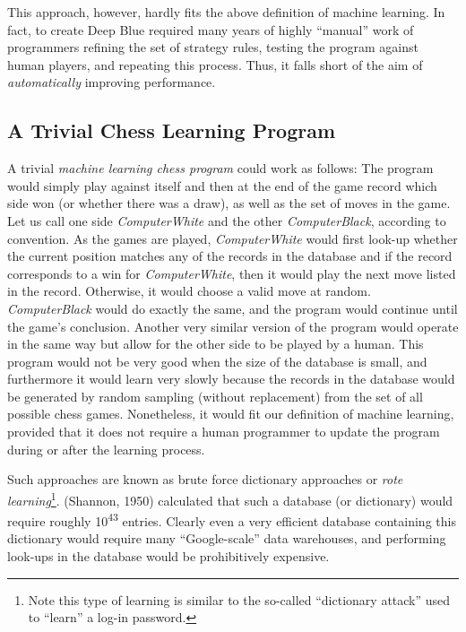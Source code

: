 This approach, however, hardly fits the above definition of machine learning. In fact, to create Deep Blue required many years of highly ``manual'' work of programmers refining the set of strategy rules, testing the program against human players, and repeating this process. Thus, it falls short of the aim of \emph{automatically} improving performance.

\subsection{A Trivial Chess Learning Program}
\label{sec:trivial-learning}

A trivial \emph{machine learning chess program} could work as follows: The program would simply play against itself and then at the end of the game record which side won (or whether there was a draw), as well as the set of moves in the game. Let us call one side \emph{ComputerWhite} and the other \emph{ComputerBlack}, according to convention. As the games are played, \emph{ComputerWhite} would first look-up whether the current position matches any of the records in the database and if the record corresponds to a win for \emph{ComputerWhite}, then it would play the next move listed in the record.  Otherwise, it would choose a valid move at random. \emph{ComputerBlack} would do exactly the same, and the program would continue until the game's conclusion. Another very similar version of the program would operate in the same way but allow for the other side to be played by a human. This program would not be very good when the size of the database is small, and furthermore it would learn very slowly because the records in the database would be generated by random sampling (without replacement) from the set of all possible chess games. Nonetheless, it would fit our definition of machine learning, provided that it does not require a human programmer to update the program during or after the learning process.

Such approaches are known as brute force dictionary approaches or \emph{rote learning}\footnote{Note this type of learning is similar to the so-called ``dictionary attack'' used to ``learn'' a log-in password.}. (Shannon, 1950) calculated that such a database (or dictionary) would require roughly 10\textsuperscript{43} entries. Clearly even a very efficient database containing this dictionary would require many ``Google-scale'' data warehouses, and performing look-ups in the database would be prohibitively expensive.  


